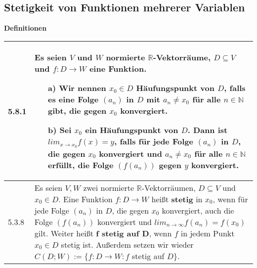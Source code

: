 \subsection{Stetigkeit von Funktionen mehrerer Variablen}
        \noindent
    \textbf{Definitionen}
    \begin{table}[H]  
    \begin{tabularx}{\textwidth}{X m{16cm}}
        \toprule

        5.8.1 & Es seien $V$ und $W$ normierte $\mathbb{R}$-Vektorräume, $D \subseteq V$ und $f: D \rightarrow W$ eine Funktion.
                \begin{itemize}[topsep=-0.5cm]
                    \item[a)] Wir nennen $x_0 \in D$ \textbf{Häufungspunkt} von $D$, falls es eine Folge $(a_n)$ in $D$ mit 
                                $a_n \neq x_0$ für alle $n \in \mathbb{N}$ gibt, die gegen $x_0$ konvergiert.
                    \item[b)] Sei $x_0$ ein Häufungspunkt von $D$. Dann ist $lim_{x \rightarrow x_0} f(x) = y$, falls für jede 
                                Folge $(a_n)$ in $D$, die gegen $x_0$ konvergiert und $a_n \neq x_0$ für alle $n \in \mathbb{N}$
                                erfüllt, die Folge $(f(a_n))$ gegen $y$ konvergiert.
                \end{itemize} \vspace{-0cm} \\
        \midrule
        5.3.8 & Es seien $V,W$ zwei normierte $\mathbb{R}$-Vektorräumen, $D \subseteq V$ und $x_0 \in D$. Eine Funktion $f: D\rightarrow W$
                heißt \textbf{stetig} in $x_0$, wenn für jede Folge $(a_n)$ in $D$, die gegen $x_0$ konvergiert, auch die Folge
                $(f(a_n))$ konvergiert und $lim_{n \rightarrow \infty} f(a_n) = f(x_0)$ gilt. \hfill \break
                Weiter heißt \textbf{f stetig auf D}, wenn $f$ in jedem Punkt $x_0 \in D$ stetig ist. \hfill \break
                Au\ss erdem setzen wir wieder $C(D;W) := \{f: D\rightarrow W: f$ stetig auf $D$\}. \\

        \bottomrule

    \end{tabularx}
    \end{table}

    \pagebreak

